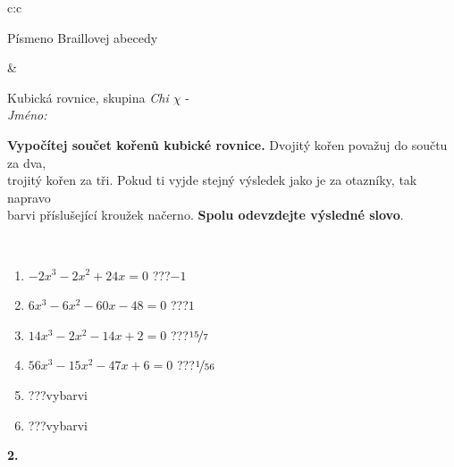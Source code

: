 \documentclass[10pt]{report}
\begin{document}
\begin{tabular}{c:c}
\begin{minipage}[c][104.5mm][t]{0.5\linewidth}
\begin{center}
\begin{minipage}{0.20\linewidth}
\begin{center}
{\small Písmeno Braillovej abecedy}
\end{center}
\end{minipage}
\end{center}
\end{minipage}
&
\begin{minipage}[c][104.5mm][t]{0.5\linewidth}
\begin{center}
\vspace{7mm}
{\huge Kubická rovnice, skupina \textit{Chi $\chi$} -}\\[5mm]
\textit{Jméno:}\phantom{xxxxxxxxxxxxxxxxxxxxxxxxxxxxxxxxxxxxxxxxxxxxxxxxxxxxxxxxxxxxxxxxx}\\[5mm]
\begin{minipage}{0.95\linewidth}
\begin{center}
\textbf{Vypočítej součet kořenů kubické rovnice.} Dvojitý kořen považuj do součtu za dva,\\trojitý kořen za tři. Pokud ti vyjde stejný výsledek jako je za otazníky, tak napravo\\barvi příslušející kroužek načerno. \textbf{Spolu odevzdejte výsledné slovo}.
\end{center}
\end{minipage}
\\[1mm]
\begin{minipage}{0.79\linewidth}
\begin{center}
\begin{varwidth}{\linewidth}
\begin{enumerate}
\Large
\item $-2x^3-2x^2+24x=0$\quad \dotfill\; ???\;\dotfill \quad $-1$
\item $6x^3-6x^2-60x-48=0$\quad \dotfill\; ???\;\dotfill \quad $1$
\item $14x^3-2x^2-14x+2=0$\quad \dotfill\; ???\;\dotfill \quad $\nicefrac{15}{7}$
\item $56x^3-15x^2-47x+6=0$\quad \dotfill\; ???\;\dotfill \quad $\nicefrac{1}{56}$
\item \quad \dotfill\; ???\;\dotfill \quad vybarvi
\item \quad \dotfill\; ???\;\dotfill \quad vybarvi
\end{enumerate}
\end{varwidth}
\end{center}
\end{minipage}
\begin{minipage}{0.20\linewidth}
\begin{center}
{\Huge\bfseries 2.} \\[2mm]

\end{center}
\end{minipage}
\end{center}
\end{minipage}
\end{tabular}
\end{document}
